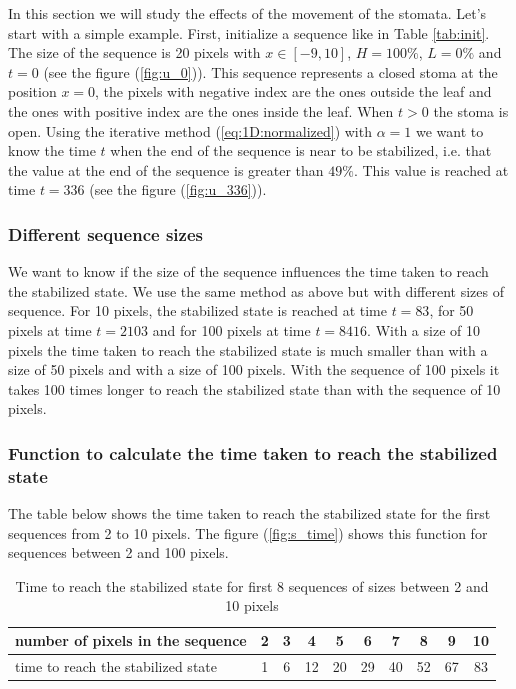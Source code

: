 In this section we will study the effects of the movement of the stomata. Let's start 
with a simple example. First, initialize a sequence like in Table \ref{tab:init}. The size 
of the sequence is 20 pixels with $x \in [-9,10]$, $H=100\%$, $L=0\%$ and $t=0$ (see the 
figure (\ref{fig:u_0})). This sequence represents a closed stoma at the position $x=0$, 
the pixels with negative index are the ones outside the leaf and the ones with positive 
index are the ones inside the leaf. When $t>0$ the stoma is open. Using the iterative 
method (\ref{eq:1D:normalized}) with $\alpha = 1$ we want to know the time $t$ when the 
end of the sequence is near to be stabilized, i.e. that the value at the end of the 
sequence is greater than $49\%$. This value is reached at time $t=336$ (see the figure 
(\ref{fig:u_336})).

\subsubsection{Different sequence sizes}

We want to know if the size of the sequence influences the time taken to reach the
stabilized state. We use the same method as above but with different sizes of sequence.
For 10 pixels, the stabilized state is reached at time $t=83$, for 50 pixels at time 
$t=2103$ and for 100 pixels at time $t=8416$. With a size of 10 pixels the time taken to 
reach the stabilized state is much smaller than with a size of 50 pixels and with a size 
of 100 pixels. With the sequence of 100 pixels it takes 100 times longer to reach the 
stabilized state than with the sequence of 10 pixels.

\subsubsection{Function to calculate the time taken to reach the stabilized state}

The table below shows the time taken to reach the stabilized state for the first 
sequences from 2 to 10 pixels. The figure (\ref{fig:s_time}) shows this function
for sequences between 2 and 100 pixels.

\begin{table}[h]
    \centering
    \begin{tabular}{|l|c|c|c|c|c|c|c|c|c|} \hline
        number of pixels in the sequence   & 2 & 3 & 4 & 5 & 6 & 7 & 8 & 9 & 10 \\\hline
        time to reach the stabilized state & 1 & 6 & 12 & 20 & 29 & 40 & 52 & 67 & 83 \\\hline
    \end{tabular}
    \caption{Time to reach the stabilized state for first 8 sequences of sizes between 2 and 10 pixels}
    \label{tab:s_time}
\end{table}

